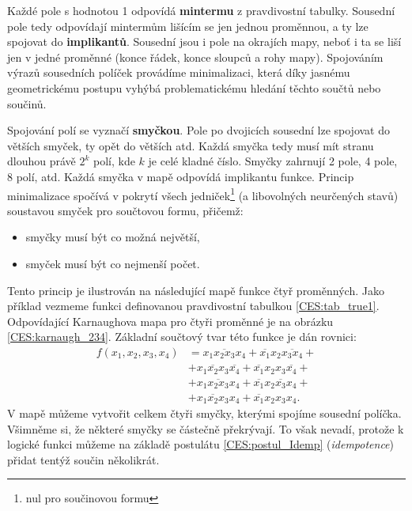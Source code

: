      Každé pole s hodnotou 1 odpovídá \textbf{mintermu} z pravdivostní tabulky. Sousední pole tedy 
     odpovídají mintermům lišícím se jen jednou proměnnou, a ty lze spojovat do 
     \textbf{implikantů}. Sousední jsou i pole na okrajích mapy, neboť i ta se liší
     jen v jedné proměnné (konce řádek, konce sloupců a rohy mapy). Spojováním výrazů sousedních 
     políček provádíme minimalizaci, která díky jasnému geometrickému postupu vyhýbá 
     problematickému hledání těchto součtů nebo součinů. 
     
     Spojování polí se vyznačí \textbf{smyčkou}. Pole po dvojicích sousední lze spojovat do větších 
     smyček, ty opět do větších atd. Každá smyčka tedy musí mít stranu dlouhou právě $2^k$ polí, 
     kde $k$  je celé kladné číslo. Smyčky zahrnují 2 pole, 4 pole, 8 polí, atd. Každá smyčka v 
     mapě odpovídá implikantu funkce. Princip minimalizace spočívá v pokrytí všech     
     jedniček\footnote{nul pro součinovou formu} (a libovolných neurčených stavů) soustavou smyček 
     pro součtovou formu, přičemž:
     \begin{itemize}\addtolength{\itemsep}{-0.5\baselineskip}
       \item smyčky musí být co možná největší,
       \item smyček musí být co nejmenší počet.       
     \end{itemize}     
     Tento princip je ilustrován na následující mapě funkce čtyř proměnných. Jako příklad vezmeme 
     funkci definovanou pravdivostní tabulkou \ref{CES:tab_true1}. Odpovídající Karnaughova mapa 
     pro čtyři proměnné je na obrázku \ref{CES:karnaugh_234}. Základní součtový tvar této funkce je 
     dán rovnici:     
     \begin{align}
        f(x_1, x_2, x_3, x_4) 
          &= \overline{x_1x_2x_3x_4} + \overline{x_1}x_2\overline{x_3x_4} +           \nonumber \\
          &+ x_1\overline{x_2}x_3\overline{x_4} + \overline{x_1}x_2x_3\overline{x_4}+ \nonumber \\ 
          &+ x_1\overline{x_2x_3}x_4 + \overline{x_1}x_2\overline{x_3}x_4 +           \nonumber \\ 
          &+ x_1\overline{x_2}x_3x_4 + \overline{x_1}x_2x_3x_4.                          
     \end{align}
     V mapě můžeme vytvořit celkem čtyři smyčky, kterými spojíme sousední políčka. Všimněme si, že 
     některé smyčky se částečně překrývají. To však nevadí, protože k logické funkci můžeme na 
     základě postulátu \ref{CES:postul_Idemp} (\emph{idempotence})
     přidat tentýž součin několikrát. 
     
